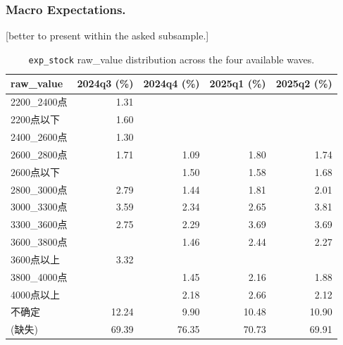 \documentclass[11pt,letterpaper,english,final]{article}
\begin{document}
\subsubsection{Macro Expectations.}
{\color{cyan}[better to present within the asked subsample.]}
\begin{table}[H]
\centering
\small
\setlength{\tabcolsep}{6pt}
\caption{\texttt{exp\_stock} raw\_value distribution across the four available waves.}
\label{tab:exp_stock_dist}
\begin{tabular}{@{}l r r r r@{}}
\toprule
{raw\_value} & {2024q3 (\%)} & {2024q4 (\%)} & {2025q1 (\%)} & {2025q2 (\%)} \\
\midrule
2200\_2400点  & 1.31  &       &       &       \\
2200点以下    & 1.60  &       &       &       \\
2400\_2600点  & 1.30  &       &       &       \\
2600\_2800点  & 1.71  & 1.09  & 1.80  & 1.74  \\
2600点以下    &       & 1.50  & 1.58  & 1.68  \\
2800\_3000点  & 2.79  & 1.44  & 1.81  & 2.01  \\
3000\_3300点  & 3.59  & 2.34  & 2.65  & 3.81  \\
3300\_3600点  & 2.75  & 2.29  & 3.69  & 3.69  \\
3600\_3800点  &       & 1.46  & 2.44  & 2.27  \\
3600点以上    & 3.32  &       &       &       \\
3800\_4000点  &       & 1.45  & 2.16  & 1.88  \\
4000点以上    &       & 2.18  & 2.66  & 2.12  \\
不确定       & 12.24 & 9.90  & 10.48 & 10.90 \\
\midrule
(缺失)       & 69.39 & 76.35 & 70.73 & 69.91 \\
\bottomrule
\end{tabular}
\end{table}
\end{document}
